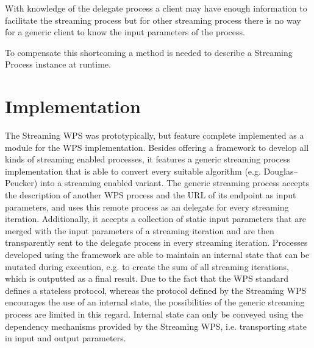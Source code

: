     With knowledge of the delegate process a client may have enough information to facilitate the streaming process but for other streaming process there is no way for a generic client to know the input parameters of the process.

    To compensate this shortcoming a method is needed to describe a Streaming Process instance at runtime.

  \section{Implementation}
    The Streaming WPS was prototypically, but feature complete implemented as a module for the \ftn WPS implementation. Besides offering a framework to develop all kinds of streaming enabled processes, it features a generic streaming process implementation that is able to convert every suitable algorithm (e.g. Douglas–Peucker) into a streaming enabled variant. The generic streaming process accepts the description of another WPS process and the URL of its endpoint as input parameters, and uses this remote process as an delegate for every streaming iteration. Additionally, it accepts a collection of static input parameters that are merged with the input parameters of a streaming iteration and are then transparently sent to the delegate process in every streaming iteration. Processes developed using the framework are able to maintain an internal state that can be mutated during execution, e.g. to create the sum of all streaming iterations, which is outputted as a final result. Due to the fact that the WPS standard defines a stateless protocol, whereas the protocol defined by the Streaming WPS encourages the use of an internal state, the possibilities of the generic streaming process are limited in this regard. Internal state can only be conveyed using the dependency mechanisms provided by the Streaming WPS, i.e. transporting state in input and output parameters.

